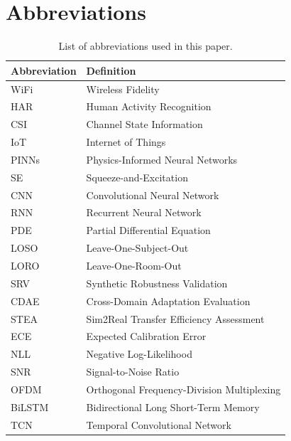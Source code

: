 \documentclass[journal]{IEEEtran}
\begin{document}
\section{Abbreviations}
\begin{table}[h]
\centering
\caption{List of abbreviations used in this paper.}
\label{tab:abbreviations}
\small
\begin{tabular}{@{}ll@{}}
\toprule
\textbf{Abbreviation} & \textbf{Definition} \\
\midrule
WiFi & Wireless Fidelity \\
HAR & Human Activity Recognition \\
CSI & Channel State Information \\
IoT & Internet of Things \\
PINNs & Physics-Informed Neural Networks \\
SE & Squeeze-and-Excitation \\
CNN & Convolutional Neural Network \\
RNN & Recurrent Neural Network \\
PDE & Partial Differential Equation \\
LOSO & Leave-One-Subject-Out \\
LORO & Leave-One-Room-Out \\
SRV & Synthetic Robustness Validation \\
CDAE & Cross-Domain Adaptation Evaluation \\
STEA & Sim2Real Transfer Efficiency Assessment \\
ECE & Expected Calibration Error \\
NLL & Negative Log-Likelihood \\
SNR & Signal-to-Noise Ratio \\
OFDM & Orthogonal Frequency-Division Multiplexing \\
BiLSTM & Bidirectional Long Short-Term Memory \\
TCN & Temporal Convolutional Network \\
\bottomrule
\end{tabular}
\end{table}



\end{document}
